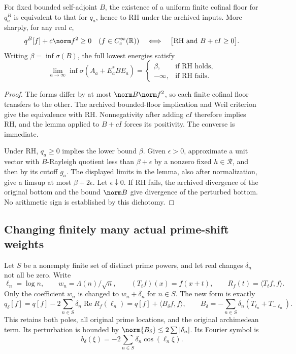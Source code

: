 \begin{theorem}\label{thm:ns57-bounded-floor-stability}
For fixed bounded self-adjoint $B$, the existence of a uniform finite
cofinal floor for $q_a^B$ is equivalent to that for $q_a$, hence to RH
under the archived inputs. More sharply, for any real $c$,
\[
 q^B[f]+c\norm f^2\ge0\quad(f\in C_c^\infty(\mathbb R))
 \quad\Longleftrightarrow\quad
 \bigl[\mathrm{RH}\ \hbox{and}\ B+cI\ge0\bigr].
\]
Writing $\beta=\inf\sigma(B)$, the full lowest energies satisfy
\[
 \lim_{a\to\infty}\inf\sigma(A_a+E_a^*BE_a)
 =\begin{cases}\beta,&\text{if RH holds},\\-\infty,&\text{if RH fails}.
 \end{cases}
\]
\end{theorem}
\begin{proof}
The forms differ by at most $\norm B\norm f^2$, so each finite
cofinal floor transfers to the other. The archived bounded-floor
implication and Weil criterion give the equivalence with RH.
Nonnegativity after adding $cI$ therefore implies RH, and the lemma
applied to $B+cI$ forces its positivity. The converse is immediate.

Under RH, $q_a\ge0$ implies the lower bound $\beta$. Given
$\epsilon>0$, approximate a unit vector with $B$-Rayleigh quotient
less than $\beta+\epsilon$ by a nonzero fixed $h\in\mathcal R$,
and then by its cutoff $g_a$. The displayed limits in the lemma,
also after normalization, give a limsup at most $\beta+2\epsilon$.
Let $\epsilon\downarrow0$. If RH fails, the archived divergence
of the original bottom and the bound $\norm B$ give divergence
of the perturbed bottom. No arithmetic sign is established by this dichotomy.
\end{proof}

\subsection*{Changing finitely many actual prime-shift weights}
Let $S$ be a nonempty finite set of distinct prime powers, and let
real changes $\delta_n$ not all be zero. Write
\[
 \ell_n=\log n,\qquad w_n=\Lambda(n)/\sqrt n,\qquad
 (T_tf)(x)=f(x+t),\qquad R_f(t)=\langle T_tf,f\rangle.
\]
Only the coefficient $w_n$ is changed to $w_n+\delta_n$ for $n\in S$.
The new form is exactly
\[
 q_\delta[f]=q[f]-2\sum_{n\in S}\delta_n\operatorname{Re}R_f(\ell_n)
            =q[f]+\langle B_\delta f,f\rangle,
 \qquad B_\delta=-\sum_{n\in S}\delta_n(T_{\ell_n}+T_{-\ell_n}).
\]
This retains both poles, all original prime locations, and the original
archimedean term. Its perturbation is bounded by
$\norm{B_\delta}\le2\sum|\delta_n|$. Its Fourier symbol is
\[
 b_\delta(\xi)=-2\sum_{n\in S}\delta_n\cos(\ell_n\xi).
\]

